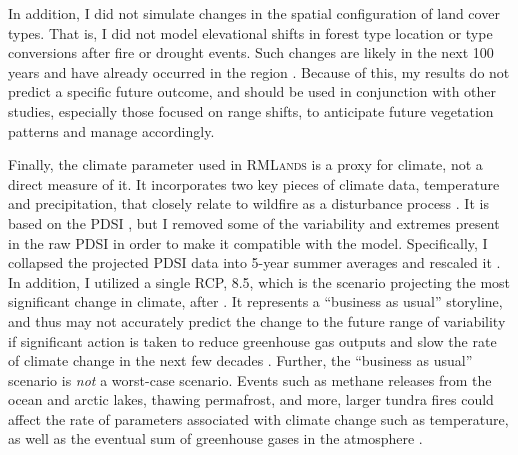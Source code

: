 In addition, I did not simulate changes in the spatial configuration of land cover types. That is, I did not model elevational shifts in forest type location or type conversions after fire or drought events. Such changes are likely in the next 100 years and have already occurred in the region \citep{Bachelet2001}. Because of this, my results do not predict a specific future outcome, and should be used in conjunction with other studies, especially those focused on range shifts, to anticipate future vegetation patterns and manage accordingly. 

Finally, the climate parameter used in \textsc{RMLands} is a proxy for climate, not a direct measure of it. It incorporates two key pieces of climate data, temperature and precipitation, that closely relate to wildfire as a disturbance process \citep{Cushman2011}. It is based on the PDSI \citep{HeimJr2002}, but I removed some of the variability and extremes present in the raw PDSI in order to make it compatible with the model. Specifically, I collapsed the projected PDSI data into 5-year summer averages and rescaled it \citep{Cushman2011}. In addition, I utilized a single RCP, 8.5, which is the scenario projecting the most significant change in climate, after \citet{Cook2014}. It represents a ``business as usual'' storyline, and thus may not accurately predict the change to the future range of variability if significant action is taken to reduce greenhouse gas outputs and slow the rate of climate change in the next few decades \citep{Riahi2011}. Further, the ``business as usual'' scenario is \emph{not} a worst-case scenario. Events such as methane releases from the ocean and arctic lakes, thawing permafrost, and more, larger tundra fires could affect the rate of parameters associated with climate change such as temperature, as well as the eventual sum of greenhouse gases in the atmosphere \citep{Racine2004,Higuera2008,Schuur2009,Shakova2010,Hu2015}.






